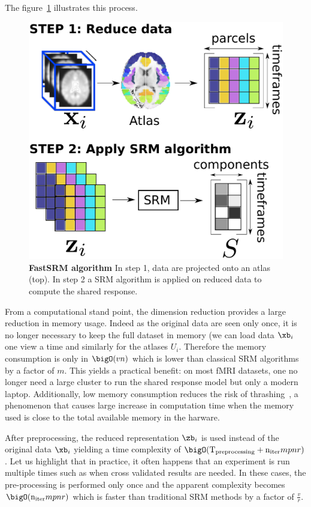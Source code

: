 The figure~\ref{fig:srm:conceptual} illustrates this process.
\begin{figure}
  \centering
  \includegraphics[scale=0.34]{figures/srm/conceptual_figure2.pdf}
  \caption{\textbf{FastSRM algorithm} In step 1, data are projected onto an atlas (top). In step 2 a SRM algorithm is applied on reduced data to compute the shared response.}
  \label{fig:srm:conceptual}
\end{figure}

From a computational stand point, the dimension reduction provides
a large reduction in memory usage. Indeed as the original data are seen only
once, it is no longer necessary to keep the full dataset in memory (we can load
data $\xb_i$ one view a time and similarly for the atlases $U_i$. Therefore the memory consumption is only in $\bigO(vn)$ which is lower than classical SRM algorithms by a factor of $m$. This yields a practical benefit: on most fMRI datasets, one no longer need a large cluster to run the shared response model but only a modern laptop.
Additionally, low memory consumption reduces the
risk of thrashing~\cite{denning1968thrashing}, a phenomenon that causes large
increase in computation time when the memory used is close to the total available
memory in the harware.

After preprocessing, the reduced representation $\zb_i$ is used instead of the
original data $\xb_i$ yielding a time complexity of $\bigO(
\mathrm{T_{preprocessing}} + \mathrm{n_{iter}} mpnr)$.
Let us highlight that in practice, it often happens that an experiment is run
multiple times such as when cross validated results are needed. In these cases,
the pre-processing is performed only once and the apparent complexity becomes
$\bigO(\mathrm{n_{iter}} mpnr)$ which is faster than traditional SRM methods by
a factor of $\frac{v}{r}$.


